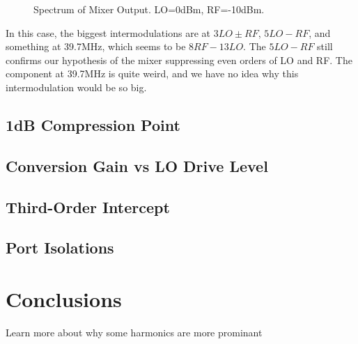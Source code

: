 \documentclass{article}
\begin{document}
\begin{figure}[h]
    \centering
    \caption{Spectrum of Mixer Output. LO=0dBm, RF=-10dBm.}
    \label{fig:mixer_out_2}
\end{figure}

In this case, the biggest intermodulations are at $3LO\pm RF$, $5LO-RF$, and something at 39.7MHz, which seems to be $8RF-13LO$.
The $5LO-RF$ still confirms our hypothesis of the mixer suppressing even orders of LO and RF.
The component at 39.7MHz is quite weird, and we have no idea why this intermodulation would be so big.

\subsection{1dB Compression Point}


\subsection{Conversion Gain vs LO Drive Level}

\subsection{Third-Order Intercept}

\subsection{Port Isolations}

\section{Conclusions}
Learn more about why some harmonics are more prominant
\end{document}
